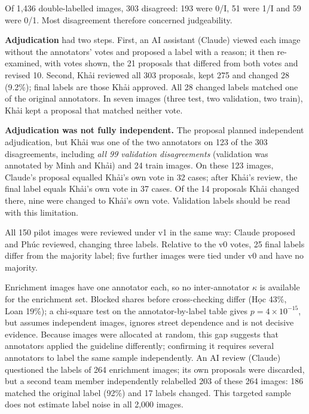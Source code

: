 Of 1,436 double-labelled images, 303 disagreed: 193 were 0/I, 51 were 1/I and 59 were 0/1. Most disagreement therefore concerned judgeability.

\textbf{Adjudication} had two steps. First, an AI assistant (Claude) viewed each image without the annotators' votes and proposed a label with a reason; it then re-examined, with votes shown, the 21 proposals that differed from both votes and revised 10. Second, Khải reviewed all 303 proposals, kept 275 and changed 28 (9.2\%); final labels are those Khải approved. All 28 changed labels matched one of the original annotators. In seven images (three test, two validation, two train), Khải kept a proposal that matched neither vote.

\textbf{Adjudication was not fully independent.} The proposal planned independent adjudication, but Khải was one of the two annotators on 123 of the 303 disagreements, including \emph{all 99 validation disagreements} (validation was annotated by Minh and Khải) and 24 train images. On these 123 images, Claude's proposal equalled Khải's own vote in 32 cases; after Khải's review, the final label equals Khải's own vote in 37 cases. Of the 14 proposals Khải changed there, nine were changed to Khải's own vote. Validation labels should be read with this limitation.

All 150 pilot images were reviewed under v1 in the same way: Claude proposed and Phúc reviewed, changing three labels. Relative to the v0 votes, 25 final labels differ from the majority label; five further images were tied under v0 and have no majority.

Enrichment images have one annotator each, so no inter-annotator $\kappa$ is available for the enrichment set. Blocked shares before cross-checking differ (Học 43\%, Loan 19\%); a chi-square test on the annotator-by-label table gives $p=4\times10^{-15}$, but assumes independent images, ignores street dependence and is not decisive evidence. Because images were allocated at random, this gap suggests that annotators applied the guideline differently; confirming it requires several annotators to label the same sample independently. An AI review (Claude) questioned the labels of 264 enrichment images; its own proposals were discarded, but a second team member independently relabelled 203 of these 264 images: 186 matched the original label (92\%) and 17 labels changed. This targeted sample does not estimate label noise in all 2,000 images.

